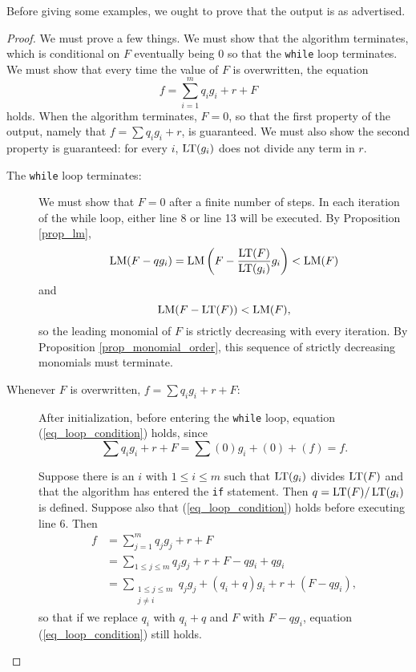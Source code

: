 Before giving some examples, we ought to prove that the output is as advertised.
\begin{proof}
  We must prove a few things.
  We must show that the algorithm terminates,
  which is conditional on $F$ eventually being 0 so that the {\tt while} loop terminates.
  We must show that every time the value of $F$ is overwritten, the equation
  \begin{equation}
    \label{eq_loop_condition}
    f = \sum_{i=1}^m q_ig_i + r + F
  \end{equation}
  holds. When the algorithm terminates, $F = 0$, so that the first property of the output,
  namely that $f = \sum q_ig_i + r$, is guaranteed.
  We must also show the second property is guaranteed:
  for every $i$, $\operatorname{LT}(g_i)$ does not divide any term in $r$.
  \begin{description}
    \item [The {\tt while} loop terminates:]
      We must show that $F = 0$ after a finite number of steps.
      In each iteration of the while loop, either line 8 or line 13 will be executed.
      By Proposition \ref{prop_lm},
      \[ \operatorname{LM}(F - qg_i) = \operatorname{LM}\left( F - \frac{\operatorname{LT}(F)}{\operatorname{LT}(g_i)}g_i\right) < \operatorname{LM}(F) \]
      and
      \[ \operatorname{LM}(F - \operatorname{LT}(F)) < \operatorname{LM}(F), \]
      so the leading monomial of $F$ is strictly decreasing with every iteration.
      By Proposition \ref{prop_monomial_order}, this sequence of strictly decreasing monomials must terminate.

    \item [Whenever $F$ is overwritten, $f = \sum q_ig_i + r + F$:]
      After initialization, before entering the {\tt while} loop,
      equation (\ref{eq_loop_condition}) holds, since
      \[ \sum q_ig_i + r + F = \sum (0)g_i + (0) + (f) = f. \]

      Suppose there is an $i$ with $1 \leq i \leq m$ such that $\operatorname{LT}(g_i)$ divides $\operatorname{LT}(F)$
      and that the algorithm has entered the {\tt if} statement.
      Then $q = \operatorname{LT}(F)/\operatorname{LT}(g_i)$ is defined.
      Suppose also that (\ref{eq_loop_condition}) holds before executing line 6. Then
      \begin{align*}
        f &= \sum_{j=1}^m q_j g_j + r + F \\
          &= \sum_{1 \leq j \leq m} q_j g_j + r + F - qg_i + q g_i \\
          &= \sum_{\substack{1 \leq j \leq m \\ j \neq i}} q_j g_j + (q_i + q) g_i + r + (F - qg_i),
      \end{align*}
      so that if we replace $q_i$ with $q_i + q$ and $F$ with $F - qg_i$, equation (\ref{eq_loop_condition}) still holds.


\end{description}
\end{proof}
